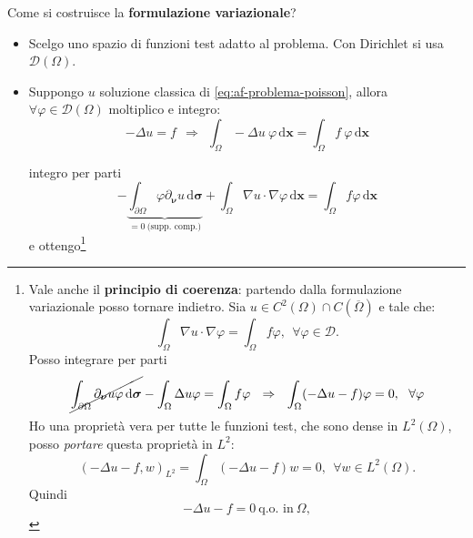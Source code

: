 \documentclass[10pt,a4paper,twoside,openright]{book}
\newcommand{\x}{\mathbf{x}}
\newcommand{\sigg}{\bm{\sigma}}
\newcommand{\nuu}{\bm{\nu}}
\newcommand{\de}{\,\mathrm d}
\newcommand{\dxx}{\de \x}
\newcommand{\dsig}{\de \sigg}
\begin{document}
Come si costruisce la \textbf{formulazione variazionale}?
\begin{itemize}
    \item Scelgo uno spazio di funzioni test adatto al problema. Con Dirichlet si usa $\displaystyle \mathcal{D}(\Omega)$.
    \item Suppongo $u$ soluzione classica di \eqref{eq:af-problema-poisson}, allora $\displaystyle \forall \varphi \in \mathcal{D}(\Omega)$ moltiplico e integro:
          \begin{equation*}
              -\Delta u=f\ \ \Rightarrow \ \ \int _{\Omega } -\Delta u\ \varphi \dxx =\int _{\Omega } f\ \varphi \dxx
          \end{equation*}

          integro per parti
          \begin{equation*}
              -\underbrace{\int _{\partial \Omega } \varphi \partial _{\bm{\nu }} u\dsig }_{=0\ \text{(supp. comp.)}} +\int _{\Omega } \nabla u\cdotp \nabla \varphi \dxx =\int _{\Omega } f\varphi \dxx
          \end{equation*}
          \newpage
          e ottengo\footnote{Vale anche il \textbf{principio di coerenza}: partendo dalla formulazione variazionale posso tornare indietro. Sia $\displaystyle u\in C^{2}(\Omega) \cap C(\overline{\Omega })$ e tale che:
              \begin{equation*}
                  \int _{\Omega } \nabla u\cdotp \nabla \varphi =\int _{\Omega } f\varphi ,\ \ \forall \varphi \in \mathcal{D} .
              \end{equation*}
              Posso integrare per parti
              \begin{equation*}
                  \cancel{\int _{\partial \Omega } \partial _{\nuu} u\varphi \dsig } -\int _{\Omega } \Delta u\varphi =\int _{\Omega } f\varphi \ \ \Rightarrow \ \ \int _{\Omega }(-\Delta u-f) \varphi =0,\ \ \forall \varphi
              \end{equation*}
              Ho una proprietà vera per tutte le funzioni test, che sono dense in $\displaystyle L^{2}(\Omega)$, posso \textit{portare} questa proprietà in $\displaystyle L^{2}$:
              \begin{equation*}
                  (-\Delta u-f,w)_{L^{2}} =\int _{\Omega }(-\Delta u-f) w=0,\ \ \forall w\in L^{2}(\Omega) .
              \end{equation*}
              Quindi
              \begin{equation*}
                  -\Delta u-f=0\ \text{q.o. in} \ \Omega ,

\end{equation*}}
\end{itemize}
\end{document}
